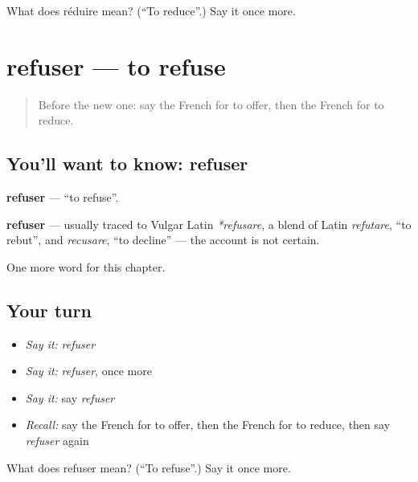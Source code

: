\begin{tcolorbox}[breakable,colback=teal!4,colframe=teal!35!black,title={Before you move on}]
What does réduire mean? (\textquotedblleft{}To reduce\textquotedblright{}.) Say it once more.
\end{tcolorbox}
\section[refuser]{refuser — to refuse}

\label{lesson:FR-C238-refuser}



\begin{quote}
Before the new one: say the French for to offer, then the French for to reduce.
\end{quote}

\subsection*{You'll want to know: refuser}
\textbf{refuser} — \textquotedblleft{}to refuse\textquotedblright{}.

\begin{cousinweb}
\textbf{refuser} — usually traced to Vulgar Latin \emph{*refusare}, a blend of Latin \emph{refutare}, \textquotedblleft{}to rebut\textquotedblright{}, and \emph{recusare}, \textquotedblleft{}to decline\textquotedblright{} — the account is not certain.
\end{cousinweb}

\begin{grammarlens}[title={What you've built}]
One more word for this chapter.
\end{grammarlens}

\subsection*{Your turn}
\begin{itemize}
\raggedright
  \item \emph{Say it:} \emph{refuser}
  \item \emph{Say it:} \emph{refuser}, once more
  \item \emph{Say it:} say \emph{refuser}
  \item \emph{Recall:} say the French for to offer, then the French for to reduce, then say \emph{refuser} again
\end{itemize}

\begin{tcolorbox}[breakable,colback=teal!4,colframe=teal!35!black,title={Before you move on}]
What does refuser mean? (\textquotedblleft{}To refuse\textquotedblright{}.) Say it once more.
\end{tcolorbox}
